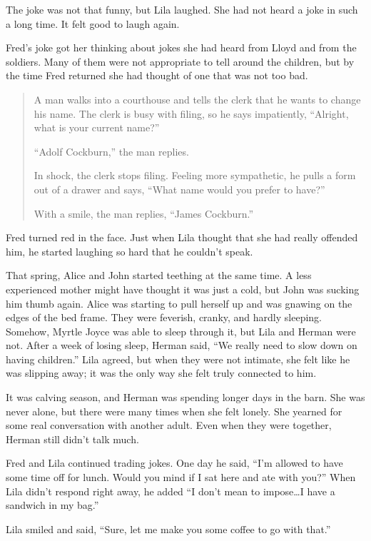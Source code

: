 \documentclass[
  american,
  letterpaper,
]{book}
\begin{document}
The joke was not that funny, but Lila laughed. She had not heard a joke
in such a long time. It felt good to laugh again.

Fred's joke got her thinking about jokes she had heard from Lloyd and
from the soldiers. Many of them were not appropriate to tell around the
children, but by the time Fred returned she had thought of one that was
not too bad.

\begin{quote}
A man walks into a courthouse and tells the clerk that he wants to
change his name. The clerk is busy with filing, so he says impatiently,
``Alright, what is your current name?''

``Adolf Cockburn,'' the man replies.

In shock, the clerk stops filing. Feeling more sympathetic, he pulls a
form out of a drawer and says, ``What name would you prefer to have?''

With a smile, the man replies, ``James Cockburn.''
\end{quote}

Fred turned red in the face. Just when Lila thought that she had really
offended him, he started laughing so hard that he couldn't speak.

That spring, Alice and John started teething at the same time. A less
experienced mother might have thought it was just a cold, but John was
sucking him thumb again. Alice was starting to pull herself up and was
gnawing on the edges of the bed frame. They were feverish, cranky, and
hardly sleeping. Somehow, Myrtle Joyce was able to sleep through it, but
Lila and Herman were not. After a week of losing sleep, Herman said,
``We really need to slow down on having children.'' Lila agreed, but
when they were not intimate, she felt like he was slipping away; it was
the only way she felt truly connected to him.

It was calving season, and Herman was spending longer days in the barn.
She was never alone, but there were many times when she felt lonely. She
yearned for some real conversation with another adult. Even when they
were together, Herman still didn't talk much.

Fred and Lila continued trading jokes. One day he said, ``I'm allowed to
have some time off for lunch. Would you mind if I sat here and ate with
you?'' When Lila didn't respond right away, he added ``I don't mean to
impose\ldots I have a sandwich in my bag.''

Lila smiled and said, ``Sure, let me make you some coffee to go with
that.''
\end{document}
